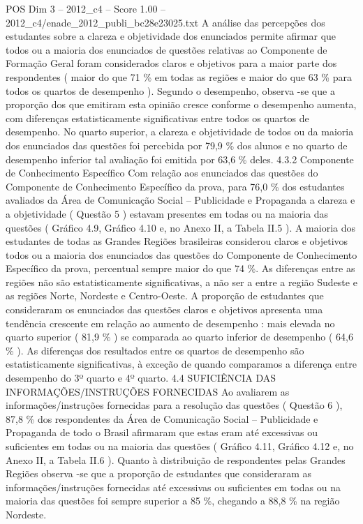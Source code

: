 \begin{textsample}{POS Dim 3 – 2012\_c4 – Score 1.00 – 2012\_c4/enade\_2012\_publi\_bc28e23025.txt}
A análise das percepções dos estudantes sobre a clareza e objetividade dos enunciados permite afirmar que todos ou a maioria dos enunciados de questões relativas ao Componente de Formação Geral foram considerados claros e objetivos para a maior parte dos respondentes ( maior do que 71 \% em todas as regiões e maior do que 63 \% para todos os quartos de desempenho ).
Segundo o desempenho, observa -se que a proporção dos que emitiram esta opinião cresce conforme o desempenho aumenta, com diferenças estatisticamente significativas entre todos os quartos de desempenho.
No quarto superior, a clareza e objetividade de todos ou da maioria dos enunciados das questões foi percebida por 79,9 \% dos alunos e no quarto de desempenho inferior tal avaliação foi emitida por 63,6 \% deles. 4.3.2 Componente de Conhecimento Específico Com relação aos enunciados das questões do Componente de Conhecimento Específico da prova, para 76,0 \% dos estudantes avaliados da Área de Comunicação Social – Publicidade e Propaganda a clareza e a objetividade ( Questão 5 ) estavam presentes em todas ou na maioria das questões ( Gráfico 4.9, Gráfico 4.10 e, no Anexo II, a Tabela II.5 ).
A maioria dos estudantes de todas as Grandes Regiões brasileiras considerou claros e objetivos todos ou a maioria dos enunciados das questões do Componente de Conhecimento Específico da prova, percentual sempre maior do que 74 \%.
As diferenças entre as regiões não são estatisticamente significativas, a não ser a entre a região Sudeste e as regiões Norte, Nordeste e Centro-Oeste.
A proporção de estudantes que consideraram os enunciados das questões claros e objetivos apresenta uma tendência crescente em relação ao aumento de desempenho : mais elevada no quarto superior ( 81,9 \% ) se comparada ao quarto inferior de desempenho ( 64,6 \% ).
As diferenças dos resultados entre os quartos de desempenho são estatisticamente significativas, à exceção de quando comparamos a diferença entre desempenho do 3º quarto e 4º quarto. 4.4 SUFICIÊNCIA DAS INFORMAÇÕES/INSTRUÇÕES FORNECIDAS Ao avaliarem as informações/instruções fornecidas para a resolução das questões ( Questão 6 ), 87,8 \% dos respondentes da Área de Comunicação Social – Publicidade e Propaganda de todo o Brasil afirmaram que estas eram até excessivas ou suficientes em todas ou na maioria das questões ( Gráfico 4.11, Gráfico 4.12 e, no Anexo II, a Tabela II.6 ).
Quanto à distribuição de respondentes pelas Grandes Regiões observa -se que a proporção de estudantes que consideraram as informações/instruções fornecidas até excessivas ou suficientes em todas ou na maioria das questões foi sempre superior a 85 \%, chegando a 88,8 \% na região Nordeste.

\end{textsample}
